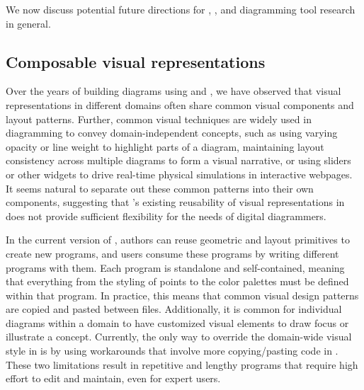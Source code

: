 We now discuss potential future directions for \Penrose, \Edgeworth, and diagramming tool research in general. 

\subsection{Composable visual representations}

Over the years of building diagrams using \Penrose and \Edgeworth, we have observed that visual representations in different domains often share common visual components and layout patterns. Further, common visual techniques are widely used in diagramming to convey domain-independent concepts, such as using varying opacity or line weight to highlight parts of a diagram, maintaining layout consistency across multiple diagrams to form a visual narrative, or using sliders or other widgets to drive real-time physical simulations in interactive webpages. It seems natural to separate out these common patterns into their own components, suggesting that \Penrose's existing reusability of visual representations in \Style{} does not provide sufficient flexibility for the needs of digital diagrammers.

In the current version of \Penrose{}, authors can reuse geometric and layout primitives to create new \Style{} programs, and users consume these programs by writing different \Substance{} programs with them. Each \Style{} program is standalone and self-contained, meaning that everything from the styling of points to the color palettes must be defined within that program. In practice, this means that common visual design patterns are copied and pasted between \Style{} files. Additionally, it is common for individual diagrams within a domain to have customized visual elements to draw focus or illustrate a concept. Currently, the only way to override the domain-wide visual style in \Penrose{} is by using workarounds that involve more copying/pasting code in \Style{}. These two limitations result in repetitive and lengthy programs that require high effort to edit and maintain, even for expert \Penrose{} users.

